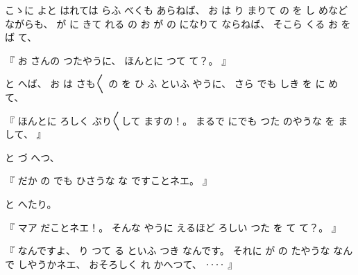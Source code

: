 
%
こゝに
よと
はれては
らふ
べくも
あらねば、
%
お
は
り
まりて%
の
を
し
めなど
ながらも、
%
が
に
きて
れる
の
お
が
の
になりて
ならねば、%
%
そこら
くる
お
をば
て、

%
『
お
さんの
つたやうに、
%
ほんとに
つて%
て？。
』

%
と
へば、
%
お
は
さも〳〵
の
を
ひ
ふ
といふ
やうに、
%
さら
でも
しき
を
に
めて、

%
『
ほんとに
ろしく
ぶり〳〵して
ますの！。
%
まるで
にでも
つた%
のやうな
を
まして、
』

%
と
づ
へつ、

%
『
だか
の
でも
ひさうな
な
ですことネエ。
』

%
と
へたり。

%
『
マア
だことネエ！。
%
そんな
やうに
えるほど
ろしい
つた
を
て
て？。
』

%
『
なんですよ、
%
り
つて
る
といふ
つき
なんです。
%
それに
が
の
たやうな
なんで
しやうかネエ、
%
おそろしく
れ
かへつて、
%
‥‥
』

